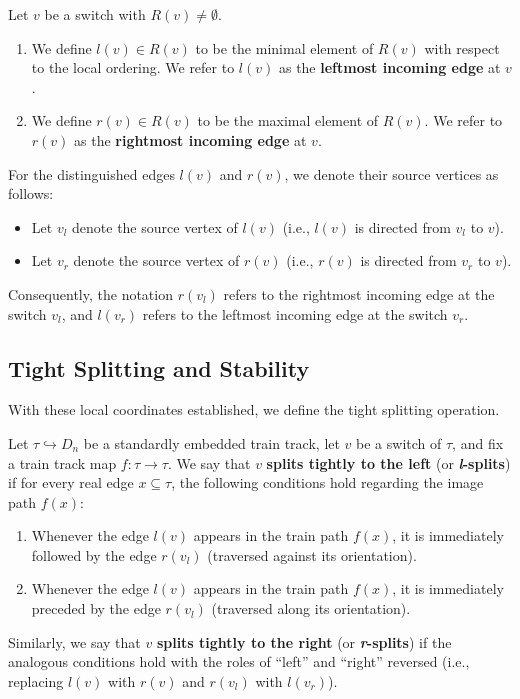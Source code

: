 \begin{definition}
Let $v$ be a switch with $R(v) \neq \emptyset$.
\begin{enumerate}
    \item We define $l(v) \in R(v)$ to be the minimal element of $R(v)$ with respect to the local ordering. We refer to $l(v)$ as the \textbf{leftmost incoming edge} at $v$.
    \item We define $r(v) \in R(v)$ to be the maximal element of $R(v)$. We refer to $r(v)$ as the \textbf{rightmost incoming edge} at $v$.
\end{enumerate}
\end{definition}

\begin{definition}
For the distinguished edges $l(v)$ and $r(v)$, we denote their source vertices as follows:
\begin{itemize}
    \item Let $v_l$ denote the source vertex of $l(v)$ (i.e., $l(v)$ is directed from $v_l$ to $v$).
    \item Let $v_r$ denote the source vertex of $r(v)$ (i.e., $r(v)$ is directed from $v_r$ to $v$).
\end{itemize}
Consequently, the notation $r(v_l)$ refers to the rightmost incoming edge at the switch $v_l$, and $l(v_r)$ refers to the leftmost incoming edge at the switch $v_r$.
\end{definition}

\subsection{Tight Splitting and Stability}

With these local coordinates established, we define the tight splitting operation.

\begin{definition}
\label{def:tight-splitting}
Let $\tau \hookrightarrow D_n$ be a standardly embedded train track, let $v$ be a switch of $\tau$, and fix a train track map $f \colon \tau \to \tau$.
We say that $v$ \textbf{splits tightly to the left} (or \textbf{\textit{l}-splits}) if for every real edge $x \subseteq \tau$, the following conditions hold regarding the image path $f(x)$:
\begin{enumerate}
    \item Whenever the edge $l(v)$ appears in the train path $f(x)$, it is immediately followed by the edge $r(v_l)$ (traversed against its orientation).
    \item Whenever the edge $l(v)$ appears in the train path $f(x)$, it is immediately preceded by the edge $r(v_l)$ (traversed along its orientation).
\end{enumerate}
Similarly, we say that $v$ \textbf{splits tightly to the right} (or \textbf{\textit{r}-splits}) if the analogous conditions hold with the roles of ``left'' and ``right'' reversed (i.e., replacing $l(v)$ with $r(v)$ and $r(v_l)$ with $l(v_r)$).
\end{definition}


